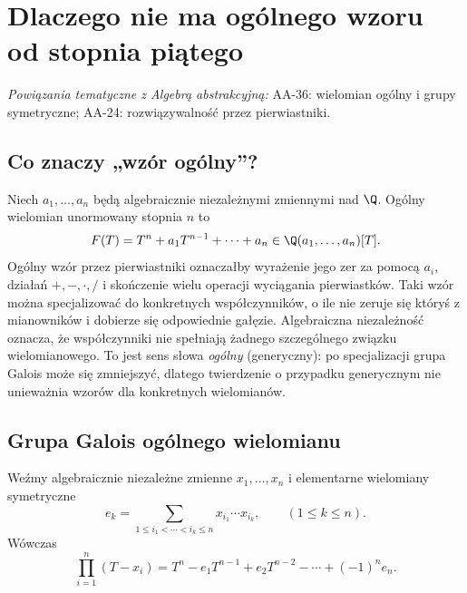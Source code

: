 \chapter{Dlaczego nie ma ogólnego wzoru od stopnia piątego}

\providecommand{\atlasref}[2]{#2}
\noindent\emph{Powiązania tematyczne z Algebrą abstrakcyjną:} \atlasref{AA-36::aa:ch:generic-polynomial}{AA-36: wielomian ogólny i grupy symetryczne}; \atlasref{AA-24::aa:ch:radical-solvability}{AA-24: rozwiązywalność przez pierwiastniki}.


\section{Co znaczy „wzór ogólny”?}

Niech $a_1,\dots,a_n$ będą algebraicznie niezależnymi zmiennymi nad $\Q$. Ogólny wielomian unormowany stopnia $n$ to
\[
F(T)=T^n+a_1T^{n-1}+\cdots+a_n\in\Q(a_1,\dots,a_n)[T].
\]
Ogólny wzór przez pierwiastniki oznaczałby wyrażenie jego zer za pomocą $a_i$, działań $+,-,\cdot,/$ i skończenie wielu operacji wyciągania pierwiastków. Taki wzór można specjalizować do konkretnych współczynników, o ile nie zeruje się któryś z mianowników i dobierze się odpowiednie gałęzie. Algebraiczna niezależność oznacza, że współczynniki nie spełniają żadnego szczególnego związku wielomianowego. To jest sens słowa \emph{ogólny} (generyczny): po specjalizacji grupa Galois może się zmniejszyć, dlatego twierdzenie o przypadku generycznym nie unieważnia wzorów dla konkretnych wielomianów.

\section{Grupa Galois ogólnego wielomianu}

Weźmy algebraicznie niezależne zmienne $x_1,\dots,x_n$ i elementarne wielomiany symetryczne
\[
e_k=\sum_{1\le i_1<\cdots<i_k\le n}x_{i_1}\cdots x_{i_k},\qquad(1\le k\le n).
\]
Wówczas
\[
\prod_{i=1}^n(T-x_i)=T^n-e_1T^{n-1}+e_2T^{n-2}-\cdots+(-1)^ne_n.
\]

